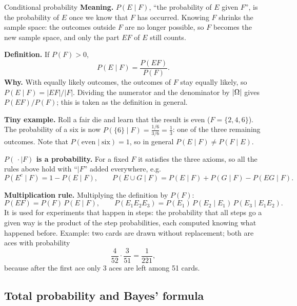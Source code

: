 \begin{key}{Conditional probability}
	\setlength{\parskip}{5pt}
	\textbf{Meaning.} $P(E\mid F)$, ``the probability of $E$ given $F$'', is
	the probability of $E$ once we know that $F$ has occurred. Knowing $F$
	shrinks the sample space: the outcomes outside $F$ are no longer
	possible, so $F$ becomes the new sample space, and only the part $EF$ of
	$E$ still counts.

	\textbf{Definition.} If $P(F)>0$,
	\[ P(E\mid F)=\frac{P(EF)}{P(F)}. \]
	\textbf{Why.} With equally likely outcomes, the outcomes of $F$ stay
	equally likely, so $P(E\mid F)=|EF|/|F|$. Dividing the numerator and the
	denominator by $|\Omega|$ gives $P(EF)/P(F)$; this is taken as the
	definition in general.

	\textbf{Tiny example.} Roll a fair die and learn that the result is even
	($F=\{2,4,6\}$). The probability of a six is now
	$P(\{6\}\mid F)=\frac{1/6}{3/6}=\frac13$: one of the three remaining
	outcomes. Note that $P(\text{even}\mid\text{six})=1$, so in general
	$P(E\mid F)\ne P(F\mid E)$.

	\textbf{$P(\,\cdot\mid F)$ is a probability.} For a fixed $F$ it
	satisfies the three axioms, so all the rules above hold with ``$\mid F$''
	added everywhere, e.g.
	\[ P(E^c\mid F)=1-P(E\mid F),\qquad
		P(E\cup G\mid F)=P(E\mid F)+P(G\mid F)-P(EG\mid F). \]

	\textbf{Multiplication rule.} Multiplying the definition by $P(F)$:
	\[ P(EF)=P(F)\,P(E\mid F),\qquad
		P(E_1E_2E_3)=P(E_1)\,P(E_2\mid E_1)\,P(E_3\mid E_1E_2). \]
	It is used for experiments that happen in steps: the probability that
	all steps go a given way is the product of the step probabilities, each
	computed knowing what happened before. Example: two cards are drawn
	without replacement; both are aces with probability
	\[ \frac4{52}\cdot\frac3{51}=\frac{1}{221}, \]
	because after the first ace only 3 aces are left among 51 cards.
\end{key}


\subsection*{Total probability and Bayes' formula}

